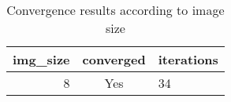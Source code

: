\begin{table}
\caption{Convergence results according to image size}
\label{tab:convergence_vs_imgsize}
\begin{tabular}{rcl}
\toprule
img_size & converged & iterations \\
\midrule
8 & Yes & 34 \\
\bottomrule
\end{tabular}
\end{table}
